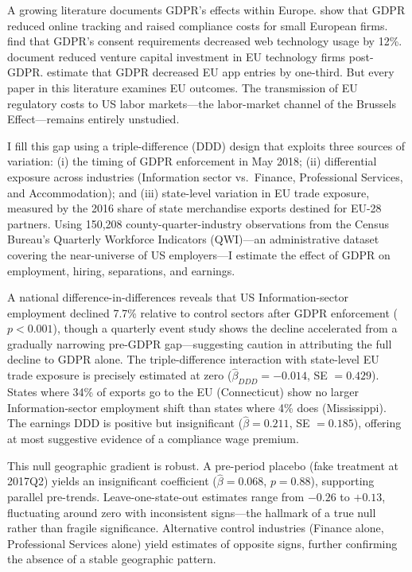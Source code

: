 \documentclass[12pt]{article}
\begin{document}
A growing literature documents GDPR's effects within Europe. \citet{Goldberg2024} show that GDPR reduced online tracking and raised compliance costs for small European firms. \citet{Janssen2022} find that GDPR's consent requirements decreased web technology usage by 12\%. \citet{Johnson2024} document reduced venture capital investment in EU technology firms post-GDPR. \citet{Zhuo2021} estimate that GDPR decreased EU app entries by one-third. But every paper in this literature examines EU outcomes. The transmission of EU regulatory costs to US labor markets---the labor-market channel of the Brussels Effect---remains entirely unstudied.

I fill this gap using a triple-difference (DDD) design that exploits three sources of variation: (i) the timing of GDPR enforcement in May 2018; (ii) differential exposure across industries (Information sector vs.\ Finance, Professional Services, and Accommodation); and (iii) state-level variation in EU trade exposure, measured by the 2016 share of state merchandise exports destined for EU-28 partners. Using 150,208 county-quarter-industry observations from the Census Bureau's Quarterly Workforce Indicators (QWI)---an administrative dataset covering the near-universe of US employers---I estimate the effect of GDPR on employment, hiring, separations, and earnings.

A national difference-in-differences reveals that US Information-sector employment declined 7.7\% relative to control sectors after GDPR enforcement ($p < 0.001$), though a quarterly event study shows the decline accelerated from a gradually narrowing pre-GDPR gap---suggesting caution in attributing the full decline to GDPR alone. The triple-difference interaction with state-level EU trade exposure is precisely estimated at zero ($\hat{\beta}_{DDD} = -0.014$, SE $= 0.429$). States where 34\% of exports go to the EU (Connecticut) show no larger Information-sector employment shift than states where 4\% does (Mississippi). The earnings DDD is positive but insignificant ($\hat{\beta} = 0.211$, SE $= 0.185$), offering at most suggestive evidence of a compliance wage premium.

This null geographic gradient is robust. A pre-period placebo (fake treatment at 2017Q2) yields an insignificant coefficient ($\hat{\beta} = 0.068$, $p = 0.88$), supporting parallel pre-trends. Leave-one-state-out estimates range from $-0.26$ to $+0.13$, fluctuating around zero with inconsistent signs---the hallmark of a true null rather than fragile significance. Alternative control industries (Finance alone, Professional Services alone) yield estimates of opposite signs, further confirming the absence of a stable geographic pattern.
\end{document}
